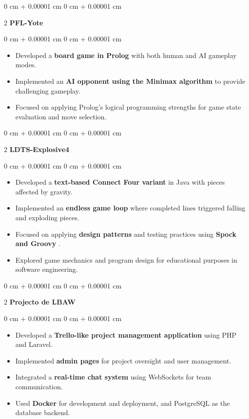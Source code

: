 \documentclass[10pt, letterpaper]{article}
\newenvironment{highlights}{
        \begin{itemize}[
            topsep=0.10 cm,
            parsep=0.10 cm,
            partopsep=0pt,
            itemsep=0pt,
            leftmargin=0 cm + 10pt
        ]
    }{
        \end{itemize}
    } %
\newenvironment{onecolentry}{
        \begin{adjustwidth}{
            0 cm + 0.00001 cm
        }{
            0 cm + 0.00001 cm
        }
    }{
        \end{adjustwidth}
    } %
\newenvironment{twocolentry}[2][]{
        \onecolentry
        \def\secondColumn{#2}
        \setcolumnwidth{\fill, 6.5cm}
        \begin{paracol}{2}
    }{
        \switchcolumn \raggedleft \secondColumn
        \end{paracol}
        \endonecolentry
    } %
\begin{document}
\begin{twocolentry}{ }\textbf{PFL-Yote}\end{twocolentry}\vspace{0.10 cm}\begin{onecolentry}\begin{highlights}
\item Developed a  \textbf{board game in Prolog}  with both human and AI gameplay modes.

\item Implemented an  \textbf{AI opponent using the Minimax algorithm}  to provide challenging gameplay.

\item Focused on applying Prolog's logical programming strengths for game state evaluation and move selection.

\end{highlights} \end{onecolentry}
\vspace{0.2 cm}
\begin{twocolentry}{ }\textbf{LDTS-Explosive4}\end{twocolentry}\vspace{0.10 cm}\begin{onecolentry}\begin{highlights}
\item Developed a  \textbf{text-based Connect Four variant}  in Java with pieces affected by gravity.

\item Implemented an  \textbf{endless game loop}  where completed lines triggered falling and exploding pieces.

\item Focused on applying  \textbf{design patterns}  and testing practices using  \textbf{Spock and Groovy} .

\item Explored game mechanics and program design for educational purposes in software engineering.

\end{highlights} \end{onecolentry}
\vspace{0.2 cm}
\begin{twocolentry}{ }\textbf{Projecto de LBAW}\end{twocolentry}\vspace{0.10 cm}\begin{onecolentry}\begin{highlights}
\item Developed a  \textbf{Trello-like project management application}  using PHP and Laravel.

\item Implemented  \textbf{admin pages}  for project oversight and user management.

\item Integrated a  \textbf{real-time chat system}  using WebSockets for team communication.

\item Used  \textbf{Docker}  for development and deployment, and PostgreSQL as the database backend.

\end{highlights} \end{onecolentry}
\end{document}
